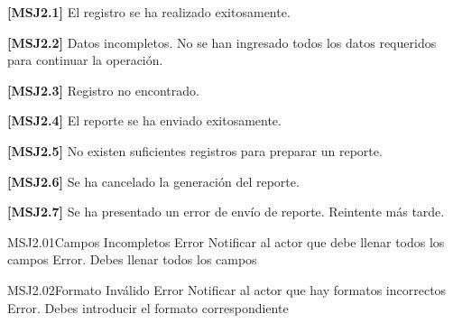 

	\begin{Citemize}
	\item {\bf [MSJ2.1]} El registro se ha realizado exitosamente.
\end{Citemize}

\begin{Citemize}
	\item {\bf [MSJ2.2]} Datos incompletos. No se han ingresado todos los datos requeridos para continuar la operación.
\end{Citemize}

\begin{Citemize}
	\item {\bf [MSJ2.3]} Registro no encontrado.
\end{Citemize}

\begin{Citemize}
	\item {\bf [MSJ2.4]} El reporte se ha enviado exitosamente.
\end{Citemize}

\begin{Citemize}
	\item {\bf [MSJ2.5]} No existen suficientes registros para preparar un reporte.
\end{Citemize}

\begin{Citemize}
	\item {\bf [MSJ2.6]} Se ha cancelado la generación del reporte.
\end{Citemize}

\begin{Citemize}
	\item {\bf [MSJ2.7]} Se ha presentado un error de envío de reporte. Reintente más tarde.
\end{Citemize}


\begin{Message}{MSJ2.01}{Campos Incompletos}
		\MSGitem[Tipo:] Error	
		\MSGitem[Objetivo: ] Notificar al actor que debe llenar todos los campos
		\MSGitem[Redacción: ] Error. Debes llenar todos los campos
	\end{Message}
	
	\begin{Message}{MSJ2.02}{Formato Inválido}
		\MSGitem[Tipo:] Error	
		\MSGitem[Objetivo: ] Notificar al actor que hay formatos incorrectos
		\MSGitem[Redacción: ] Error. Debes introducir el formato correspondiente
	\end{Message}
	
